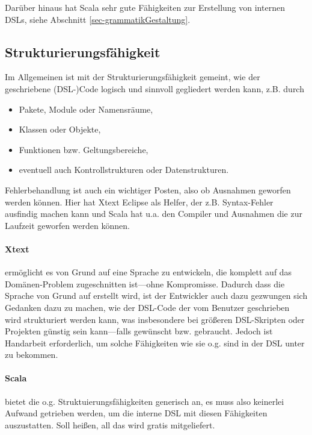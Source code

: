 Darüber hinaus hat Scala sehr gute Fähigkeiten zur Erstellung von internen
DSLs, siehe Abschnitt \ref{sec-grammatikGestaltung}.


\subsection{Strukturierungsfähigkeit}\label{sec-strukturierungsfaehigkeit}

Im Allgemeinen ist mit der Strukturierungsfähigkeit gemeint, wie der
geschriebene (DSL-)Code logisch und sinnvoll gegliedert werden kann,
z.B. durch

\begin{itemize}
  \item Pakete, Module oder Namensräume,
  \item Klassen oder Objekte,
  \item Funktionen bzw. Geltungsbereiche,
  \item eventuell auch Kontrollstrukturen oder Datenstrukturen.
\end{itemize}

Fehlerbehandlung ist auch ein wichtiger Posten, also ob Ausnahmen
geworfen werden können. Hier hat Xtext Eclipse als Helfer, der
z.B. Syntax-Fehler ausfindig machen kann und Scala hat u.a. den Compiler
und Ausnahmen die zur Laufzeit geworfen werden können.

\paragraph{Xtext} ermöglicht es von Grund auf eine Sprache zu entwickeln,
die komplett auf das Domänen-Problem zugeschnitten ist---ohne Kompromisse.
Dadurch dass die Sprache von Grund auf erstellt wird, ist der Entwickler
auch dazu gezwungen sich Gedanken dazu zu machen, wie der DSL-Code
der vom Benutzer geschrieben wird strukturiert werden kann,
was insbesondere bei größeren DSL-Skripten oder
Projekten günstig sein kann---falls gewünscht bzw. gebraucht.
Jedoch ist Handarbeit erforderlich, um solche Fähigkeiten wie sie o.g.
sind in der DSL unter zu bekommen.

\paragraph{Scala} bietet die o.g. Struktuierungsfähigkeiten generisch an,
es muss also keinerlei Aufwand getrieben werden, um die interne DSL mit
diesen Fähigkeiten auszustatten. Soll heißen, all das wird gratis mitgeliefert.


